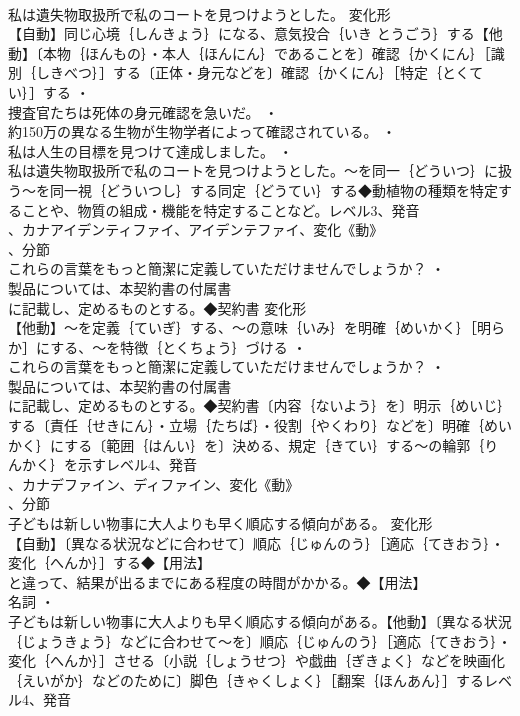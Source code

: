 \documentclass[8pt]{extreport}
\begin{document}
\begin{CJK}{UTF8}{min}
\\	私は遺失物取扱所で私のコートを見つけようとした。	変化形 
\\	【自動】同じ心境｛しんきょう｝になる、意気投合｛いき とうごう｝する【他動】〔本物｛ほんもの｝・本人｛ほんにん｝であることを〕確認｛かくにん｝［識別｛しきべつ｝］する〔正体・身元などを〕確認｛かくにん｝［特定｛とくてい｝］する ・
\\	捜査官たちは死体の身元確認を急いだ。 ・
\\	約150万の異なる生物が生物学者によって確認されている。 ・
\\	私は人生の目標を見つけて達成しました。 ・
\\	私は遺失物取扱所で私のコートを見つけようとした。～を同一｛どういつ｝に扱う～を同一視｛どういつし｝する同定｛どうてい｝する◆動植物の種類を特定することや、物質の組成・機能を特定することなど。レベル3、発音
\\	、カナアイデンティファイ、アイデンテファイ、変化《動》
\\	、分節
\\	これらの言葉をもっと簡潔に定義していただけませんでしょうか？ ・
\\	製品については、本契約書の付属書
\\	に記載し、定めるものとする。◆契約書	変化形 
\\	【他動】～を定義｛ていぎ｝する、～の意味｛いみ｝を明確｛めいかく｝［明らか］にする、～を特徴｛とくちょう｝づける ・
\\	これらの言葉をもっと簡潔に定義していただけませんでしょうか？ ・
\\	製品については、本契約書の付属書
\\	に記載し、定めるものとする。◆契約書〔内容｛ないよう｝を〕明示｛めいじ｝する〔責任｛せきにん｝・立場｛たちば｝・役割｛やくわり｝などを〕明確｛めいかく｝にする〔範囲｛はんい｝を〕決める、規定｛きてい｝する～の輪郭｛りんかく｝を示すレベル4、発音
\\	、カナデファイン、ディファイン、変化《動》
\\	、分節
\\	子どもは新しい物事に大人よりも早く順応する傾向がある。	変化形 
\\	【自動】〔異なる状況などに合わせて〕順応｛じゅんのう｝［適応｛てきおう｝・変化｛へんか｝］する◆【用法】
\\	と違って、結果が出るまでにある程度の時間がかかる。◆【用法】
\\	名詞 ・
\\	子どもは新しい物事に大人よりも早く順応する傾向がある。【他動】〔異なる状況｛じょうきょう｝などに合わせて～を〕順応｛じゅんのう｝［適応｛てきおう｝・変化｛へんか｝］させる〔小説｛しょうせつ｝や戯曲｛ぎきょく｝などを映画化｛えいがか｝などのために〕脚色｛きゃくしょく｝［翻案｛ほんあん｝］するレベル4、発音

\end{CJK}
\end{document}
